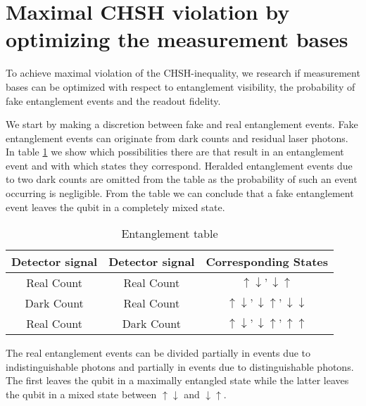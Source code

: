 \color{tudelft-cyan}
\section{Maximal CHSH violation by optimizing the measurement bases}
\color{black}
To achieve maximal violation of the CHSH-inequality, we research if measurement bases can be optimized with respect to entanglement visibility, the probability of fake entanglement events and the readout fidelity. 

We start by making a discretion between fake and real entanglement events. Fake entanglement events can originate from dark counts and residual laser photons. In table \ref{tab:entantable} we show which possibilities there are that result in an entanglement event and with which states they correspond. Heralded entanglement events due to two dark counts are omitted from the table as the probability of such an event occurring is negligible. From the  table we can conclude that a fake entanglement event leaves the qubit in a completely mixed state.
\begin{table}[hbt]
\caption{Entanglement table}
\centering
\begin{tabular}{|c|c|c|}
\hline
Detector signal & Detector signal & Corresponding States \\ \hline
Real Count & Real Count & $\uparrow \downarrow, \downarrow \uparrow$ \\ \hline
Dark Count & Real Count & $\uparrow \downarrow, \downarrow \uparrow, \downarrow \downarrow$ \\ \hline
Real Count & Dark Count & $\uparrow \downarrow, \downarrow \uparrow, \uparrow \uparrow$ \\ \hline
\end{tabular}
\label{tab:entantable}
\end{table}


The real entanglement events can be divided partially in events due to indistinguishable photons and partially in events due to distinguishable photons. The first leaves the qubit in a maximally entangled state while the latter leaves the qubit in a mixed state between $\uparrow \downarrow$ and $\downarrow \uparrow$. 

